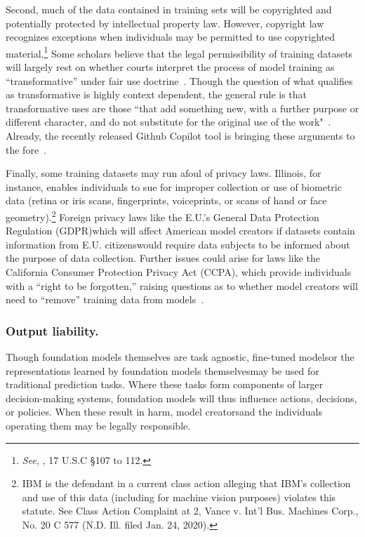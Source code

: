 Second, much of the data contained in training sets will be copyrighted and potentially protected by intellectual property law. However, copyright law recognizes exceptions when individuals may be permitted to use copyrighted material.\footnote{\textit{See, \eg}, 17 U.S.C \S 107 to 112.} Some scholars believe that the legal permissibility of training datasets will largely rest on whether courts interpret the process of model training as ``transformative'' under fair use doctrine~\citep{lemley2020fair}. Though the question of what qualifies as transformative is highly context dependent, the general rule is that transformative uses are those ``that add something new, with a further purpose or different character, and do not substitute for the original use of the work"~\citep{usco}. Already, the recently released Github Copilot tool is bringing these arguments to the fore~\citep{verge_copilot}. 


Finally, some training datasets may run afoul of privacy laws. Illinois, for instance, enables individuals to sue for improper collection or use of biometric data (\eg retina or iris scans, fingerprints, voiceprints, or scans of hand or face geometry).\footnote{IBM is the defendant in a current class action alleging that IBM's collection and use of this data (including for machine vision purposes) violates this statute. See Class Action Complaint at 2, Vance v. Int'l Bus. Machines Corp., No. 20 C 577 (N.D. Ill. filed Jan. 24, 2020).} Foreign privacy laws like the E.U.’s General Data Protection Regulation (GDPR)\dash{}which will affect American model creators if datasets contain information from E.U. citizens\dash{}would require data subjects to be informed about the purpose of data collection. Further issues could arise for laws like the California Consumer Protection Privacy Act (CCPA), which provide individuals with a ``right to be forgotten,'' raising questions as to whether model creators will need to ``remove'' training data from models~\citep{villaronga2018humans, ginart2019making}. 


\subsubsection{Output liability.} 
Though foundation models themselves are task agnostic, fine-tuned models\dash{}or the representations learned by foundation models themselves\dash{}may be used for traditional prediction tasks.   
Where these tasks form components of larger decision-making systems, foundation models will thus influence actions, decisions, or policies. When these result in harm, model creators\dash{}and the individuals operating them\dash{} may be legally responsible. 

